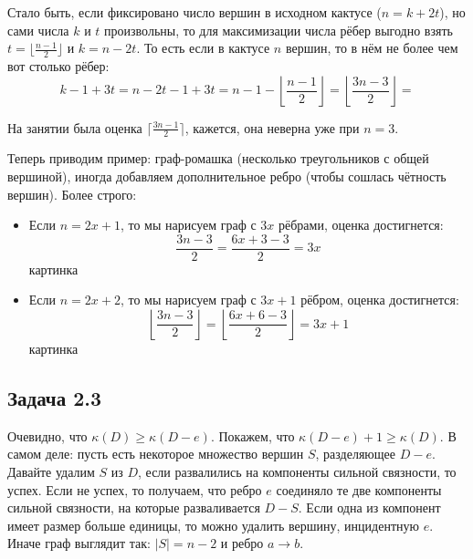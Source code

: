 	Стало быть, если фиксировано число вершин в исходном кактусе ($n=k+2t$), но сами
	числа $k$ и $t$ произвольны, то для максимизации числа рёбер выгодно взять
	$t=\lfloor \frac{n-1}{2} \rfloor$ и $k=n-2t$.
	То есть если в кактусе $n$ вершин, то в нём не более чем вот столько рёбер:
	\[
		k - 1 + 3t = n - 2t - 1 + 3t =
		n - 1 - \left\lfloor \frac{n-1}{2} \right\rfloor =
		\left\lfloor \frac{3n-3}{2} \right\rfloor =
	\]
	\begin{Rem}
		На занятии была оценка $\lceil \frac{3n-1}{2} \rceil$, кажется, она неверна
		уже при $n=3$.
	\end{Rem}
	
	Теперь приводим пример: граф-ромашка (несколько треугольников с общей вершиной),
	иногда добавляем дополнительное ребро (чтобы сошлась чётность вершин).
	Более строго:
	\begin{itemize}
		\item
			Если $n=2x+1$, то мы нарисуем граф с $3x$ рёбрами, оценка достигнется:
			\[ \frac{3n-3}{2} = \frac{6x+3-3}{2} = 3x \]
			\TODO картинка
		\item
			Если $n=2x+2$, то мы нарисуем граф с $3x+1$ рёбром, оценка достигнется:
			\[ \left\lfloor\frac{3n-3}{2}\right\rfloor = \left\lfloor\frac{6x+6-3}{2}\right\rfloor = 3x+1 \]
			\TODO картинка
	\end{itemize}

\subsection{Задача 2.3}
	Очевидно, что $\kappa(D) \ge \kappa(D - e)$.
	Покажем, что $\kappa(D - e) + 1 \ge \kappa(D)$.
	В самом деле: пусть есть некоторое множество вершин $S$, разделяющее $D-e$.
	Давайте удалим $S$ из $D$, если развалились на компоненты сильной связности, то успех.
	Если не успех, то получаем, что ребро $e$ соединяло те две компоненты сильной связности,
	на которые разваливается $D-S$.
	Если одна из компонент имеет размер больше единицы, то можно удалить вершину, инцидентную $e$.
	Иначе граф выглядит так: $|S|=n-2$ и ребро $a \to b$.
	\TODO
